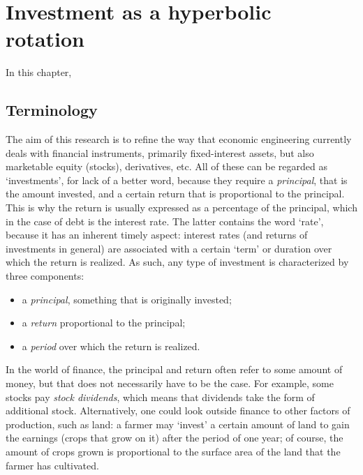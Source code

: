 \chapter{Investment as a hyperbolic rotation}
\label{chap:finance_rotation}
In this chapter, 

\section{Terminology}
The aim of this research is to refine the way that economic engineering currently deals with financial instruments, primarily fixed-interest assets, but also marketable equity (stocks), derivatives, etc. All of these can be regarded as `investments', for lack of a better word, because they require a \emph{principal}, that is the amount invested, and a certain return that is proportional to the principal. This is why the return is usually expressed as a percentage of the principal, which in the case of debt is the interest rate. The latter contains the word `rate', because it has an inherent timely aspect: interest rates (and returns of investments in general) are associated with a certain `term' or duration over which the return is realized. As such, any type of investment is characterized by three components:
\begin{itemize}
    \item a \emph{principal}, something that is originally invested;
    \item a \emph{return} proportional to the principal;
    \item a \emph{period} over which the return is realized.
\end{itemize}
In the world of finance, the principal and return often refer to some amount of money, but that does not necessarily have to be the case. For example, some stocks pay \emph{stock dividends}, which means that dividends take the form of additional stock. Alternatively, one could look outside finance to other factors of production, such as land: a farmer may `invest' a certain amount of land to gain the earnings (crops that grow on it) after the period of one year; of course, the amount of crops grown is proportional to the surface area of the land that the farmer has cultivated.

